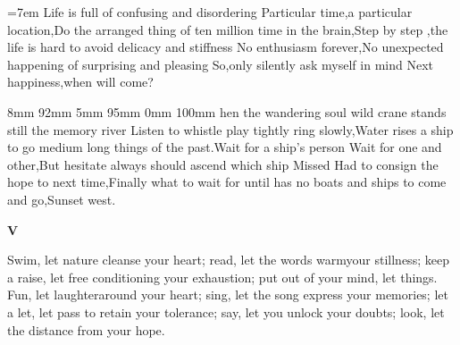 \documentclass{article}
\begin{document}
  \vspace{-6em}
   \hangindent=7em
  Life is full of confusing and disordering Particular time,a particular location,Do the arranged thing of ten million time in the brain,Step by step ,the life is hard to avoid delicacy and stiffness No enthusiasm forever,No unexpected happening of surprising and pleasing So,only silently ask myself in mind Next happiness,when will come?\par
   8mm 92mm 5mm 95mm 0mm 100mm hen the wandering soul wild crane stands still the memory river Listen to whistle play tightly ring slowly,Water rises a ship to go medium long things of the past.Wait for a ship’s person Wait for one and other,But hesitate always should ascend which ship Missed Had to consign the hope to next time,Finally what to wait for until has no boats and ships to come and go,Sunset west.\par
  \vspace{-10.2em}
  \mbox{\fontsize{160pt}{180pt}\selectfont\bf V}\par
  \newpage
  \lettrine[lines=2,lhang=0,lraise=0.2]{S}{}wim, let nature cleanse your heart; read, let the words warmyour stillness; keep a raise, let free conditioning your exhaustion; put out of your mind, let things. Fun, let laughteraround your heart; sing, let the song express your memories; let a let, let pass to retain your tolerance; say, let you unlock your doubts; look, let the distance from your hope.\par
  \begin{Parallel}[p]{50mm}{50mm}
  \end{Parallel}
\end{document}

